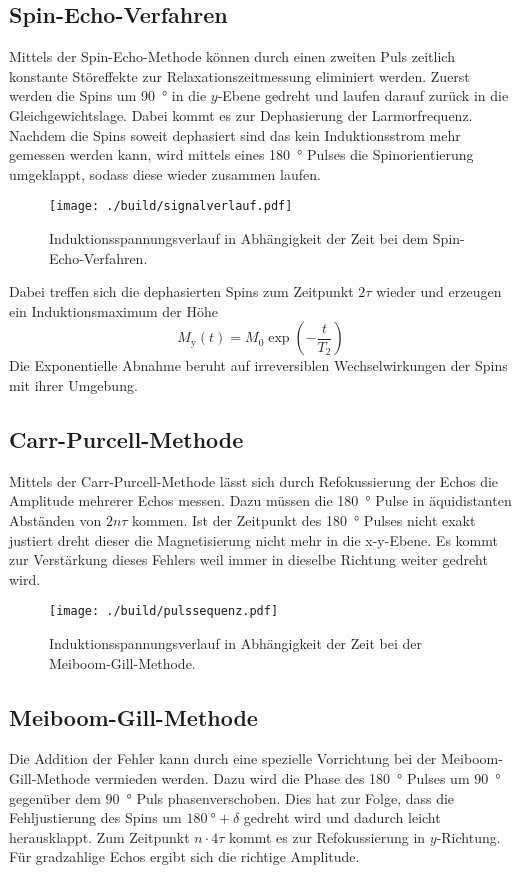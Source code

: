 \subsection{Spin-Echo-Verfahren}%
\label{sub:spin_echo_verfahren}
Mittels der Spin-Echo-Methode können durch einen zweiten Puls zeitlich
konstante Störeffekte zur Relaxationszeitmessung eliminiert werden. 
Zuerst werden die Spins um \SI{90}{\degree} in die $y$-Ebene gedreht und laufen
darauf zurück in die Gleichgewichtslage.
Dabei kommt es zur Dephasierung der Larmorfrequenz. 
Nachdem die Spins soweit dephasiert sind das kein Induktionsstrom mehr gemessen
werden kann, wird mittels eines \SI{180}{\degree} Pulses die Spinorientierung umgeklappt, 
sodass diese wieder zusammen laufen.
\begin{figure}[h]
		\centering
		\texttt{[image: ./build/signalverlauf.pdf]}
		\caption{Induktionsspannungsverlauf in Abhängigkeit der Zeit bei dem Spin-Echo-Verfahren.}%
		\label{fig:sign}
\end{figure}
Dabei treffen sich die dephasierten Spins zum Zeitpunkt $2 \tau$ wieder und
erzeugen ein Induktionsmaximum der Höhe 
\begin{equation}
		\label{eq:}
		M_\text{y}(t) = M_0 \exp\left(-\frac{t}{T_2} \right)
\end{equation}
Die Exponentielle Abnahme beruht auf irreversiblen Wechselwirkungen der Spins mit
ihrer Umgebung. 

\subsection{Carr-Purcell-Methode}%
\label{sub:car_purcell}
Mittels der Carr-Purcell-Methode lässt sich durch Refokussierung der Echos die
Amplitude mehrerer Echos messen. 
Dazu müssen die \SI{180}{\degree} Pulse in äquidistanten Abständen von $2n\tau$
kommen. 
Ist der Zeitpunkt des \SI{180}{\degree} Pulses nicht exakt justiert dreht dieser die
Magnetisierung nicht mehr in die x-y-Ebene. 
Es kommt zur Verstärkung dieses Fehlers weil immer in dieselbe Richtung weiter
gedreht wird.

\begin{figure}[ht]
		\centering
		\texttt{[image: ./build/pulssequenz.pdf]}
		\caption{Induktionsspannungsverlauf in Abhängigkeit der Zeit bei der Meiboom-Gill-Methode.}%
		\label{fig:}
\end{figure}

\subsection{Meiboom-Gill-Methode}%
\label{sub:meiboom_gill_methode}
Die Addition der Fehler kann durch eine spezielle Vorrichtung bei der
Meiboom-Gill-Methode vermieden werden.
Dazu wird die Phase des \SI{180}{\degree} Pulses um \SI{90}{\degree} gegenüber
dem \SI{90}{\degree} Puls phasenverschoben.
Dies hat zur Folge, dass die Fehljustierung des Spins um $\SI{180}{\degree} 
+ \delta$ gedreht wird und dadurch leicht herausklappt. 
Zum Zeitpunkt $n \cdot 4 \tau$ kommt es zur Refokussierung in $y$-Richtung.
Für gradzahlige Echos ergibt sich die richtige Amplitude.

